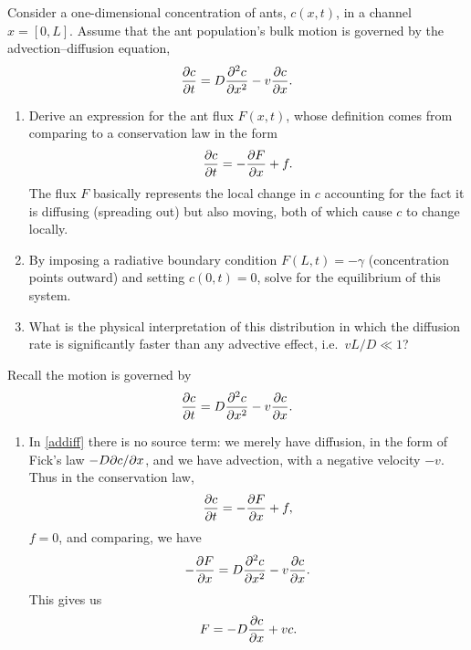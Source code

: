 \documentclass[a4paper, 12pt]{article}
\begin{document}
\begin{enumerate}[label={\bf \arabic{*}.\;}, ref={\arabic{*}},itemsep=3ex, left=0ex]
    {
      Consider a one-dimensional concentration of ants, $c(x,t)$, in a channel $x=[0,L]$. Assume that the ant population's bulk motion is governed by the advection--diffusion equation,
      \begin{equation}
        \label{addiff}
        \pd{c}{t} = D\pdd{c}{x} - v\pd{c}{x}.
      \end{equation}
      \begin{enumerate}[label=(\alph*)]
        \item Derive an expression for the ant flux $F(x,t)$, whose definition comes from comparing to a conservation law in the form
          \begin{equation}
            \pd{c}{t} = -\pd{F}{x} + f.
          \end{equation}
          The flux $F$ basically represents the local change in $c$ accounting for the fact it is diffusing (spreading out) but also moving, both of which cause $c$ to change locally.
        \item By imposing a radiative boundary condition $F(L,t) = -\gamma$ (concentration points outward) and setting $c(0,t) = 0$, solve for the equilibrium of this system.
        \item What is the physical interpretation of this distribution in which the diffusion rate is significantly faster than any advective effect, i.e.\ $vL/D \ll 1$?
      \end{enumerate}
    }
    {
      Recall the motion is governed by
      \begin{equation}
        \label{addiff}
        \pd{c}{t} = D\pdd{c}{x} - v\pd{c}{x}.
      \end{equation}
      \begin{enumerate}[label=(\alph*)]
        \item In \cref{addiff} there is no source term: we merely have diffusion, in the form of Fick's law $-D\pd{c}{x}$, and we have advection, with a negative velocity $-v$. Thus in the conservation law,
          \begin{equation}
            \pd{c}{t} = -\pd{F}{x}+f,
          \end{equation}
          $f = 0$, and comparing, we have
          \begin{equation}
            -  \pd{F}{x} =  D\pdd{c}{x} - v\pd{c}{x}.
          \end{equation}
          This gives us
          \begin{equation}
            F= -D\pd{c}{x} + v c.
          \end{equation}


\end{enumerate}}
\end{enumerate}
\end{document}
